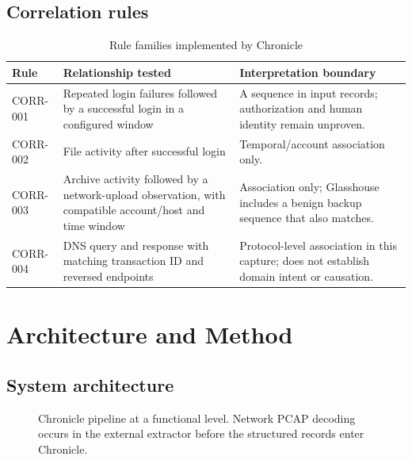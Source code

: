 \documentclass[12pt,a4paper]{report}
\begin{document}
\section{Correlation rules}
\begin{table}[H]
\centering
\caption{Rule families implemented by Chronicle}
\begin{tabularx}{\textwidth}{p{}p{}Y}
\toprule
Rule & Relationship tested & Interpretation boundary\\
\midrule
CORR-001 & Repeated login failures followed by a successful login in a configured window & A sequence in input records; authorization and human identity remain unproven.\\
CORR-002 & File activity after successful login & Temporal/account association only.\\
CORR-003 & Archive activity followed by a network-upload observation, with compatible account/host and time window & Association only; Glasshouse includes a benign backup sequence that also matches.\\
CORR-004 & DNS query and response with matching transaction ID and reversed endpoints & Protocol-level association in this capture; does not establish domain intent or causation.\\
\bottomrule
\end{tabularx}
\end{table}

\chapter{Architecture and Method}
\section{System architecture}
\begin{figure}[H]
\centering
{}
\caption{Chronicle pipeline at a functional level. Network PCAP decoding occurs in the external extractor before the structured records enter Chronicle.}
\end{figure}
\end{document}

